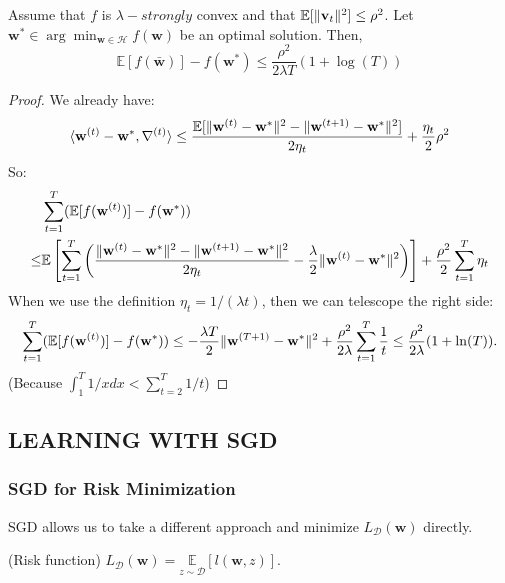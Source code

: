 \begin{thm}
	\label{thm_14_11}
	Assume that $f$ is $ \lambda-strongly $ convex and that $ \mathbb{E} [\Arrowvert \mathbf{v}_t \Arrowvert^2] \le \rho^2 $.
	Let $ \mathbf{w}^* \in \arg\min_{\mathbf{w}\in\mathcal{H}} f(\mathbf{w}) $ be an optimal solution. Then,
	\begin{equation}
		\mathbb{E}[f(\mathbf{\bar w})] - f(\mathbf{w}^*) \le \frac{\rho^2}{2\lambda T}(1+\log(T))
	\end{equation}
	\begin{proof}
		We already have:
		\begin{equation}
			\langle \mathbf{w}^{(t)} - \mathbf{w}^*, \nabla^{(t)} \rangle
			\le \frac{\mathbb{E}[\Arrowvert \mathbf{w}^{(t)} - \mathbf{w}^* \Arrowvert^2 - 
			\Arrowvert \mathbf{w}^{(t+1)} - \mathbf{w}^* \Arrowvert^2]}{2\eta_t} + \frac{\eta_t}{2} \rho^2
		\end{equation}
		So:
		\begin{align*}
			&\sum^T_{t=1} (\mathbb{E}[f(\mathbf{w}^{(t)})] - f(\mathbf{w}^*)) \\
			\le& \mathbb{E} \left[ \sum\limits^T_{t=1} \left( 
					\frac{\Arrowvert \mathbf{w}^{(t)} - \mathbf{w}^* \Arrowvert^2 - 
					\Arrowvert \mathbf{w}^{(t+1)} - \mathbf{w}^* \Arrowvert^2} {2\eta_t}	
					- \frac{\lambda}{2}
					\Arrowvert \mathbf{w}^{(t)} - \mathbf{w}^* \Arrowvert^2
			\right)	\right]
			+ \frac{\rho^2}{2} \sum\limits^T_{t=1} \eta_t
		\end{align*}
		When we use the definition $ \eta_t = 1/(\lambda t) $, then we can telescope the right side:
		\[ 
			\sum\limits^T_{t=1} ( \mathbb{E}[f(\mathbf{w}^{(t)})] - f(\mathbf{w}^*))
			\le -\frac{\lambda T}{2} \Arrowvert \mathbf{w}^{(T+1)} - \mathbf{w}^{*} \Arrowvert^2 +
			\frac{\rho^2}{2\lambda} \sum\limits^T_{t=1} \frac{1}{t}
			\le \frac{\rho^2}{2\lambda}(1+\ln(T)).
		\]
		(Because $ \int^{T}_1 1/x dx < \sum^T_{t=2} 1/t$) 
	\end{proof}
\end{thm}

\subsection{LEARNING WITH SGD}

\subsubsection{SGD for Risk Minimization}
SGD allows us to take a different approach and minimize $ L_{\mathcal{D}}(\mathbf{w}) $ directly.
\begin{defn} (Risk function)
	$ L_{\mathcal{D}}(\mathbf{w}) = \underset{z\sim\mathcal{D}}{\mathbb{E}}[ l(\mathbf{w}, z)] $.
\end{defn}

